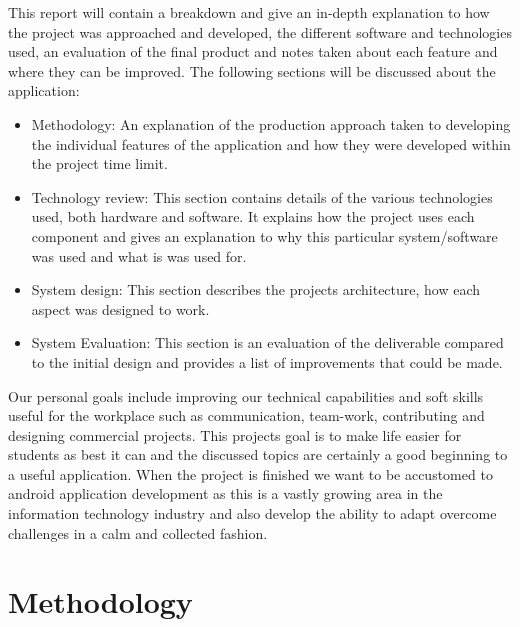 This report will contain a breakdown and give an in-depth explanation to how the project was approached and developed, the different software and technologies used, an evaluation of the final product and notes taken about each feature and where they can be improved. The following sections will be discussed about the application:
\begin{itemize}
\item Methodology: An explanation of the production approach taken to developing the individual features of the application and how they were developed within the project time limit.

\item Technology review: This section contains details of the various technologies used, both hardware and software. It explains how the project uses each component and gives an explanation to why this particular system/software was used and what is was used for.

\item System design: This section describes the projects architecture, how each aspect was designed to work.

\item System Evaluation: This section is an evaluation of the deliverable compared to the initial design and provides a list of improvements that could be made.
\end{itemize}

Our personal goals include improving our technical capabilities and soft skills useful for the workplace such as communication, team-work, contributing and designing commercial projects. This projects goal is to make life easier for students as best it can and the discussed topics are certainly a good beginning to a useful application. When the project is finished we want to be accustomed to android application development as this is a vastly growing area in the information technology industry and also develop the ability to adapt overcome challenges in a calm and collected fashion.

\chapter{Methodology}
